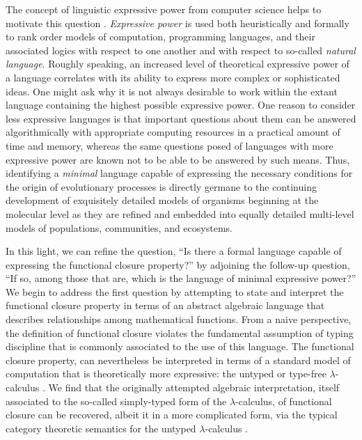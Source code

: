 \documentclass[10pt]{article}
\theoremstyle{plain}
\theoremstyle{definition}
\theoremstyle{remark}
\begin{document}
The concept of linguistic expressive power from computer science helps to motivate this question \cite{Felleisen1991}. \emph{Expressive power} is used both heuristically and formally to rank order models of computation, programming languages, and their associated logics with respect to one another and with respect to so-called \emph{natural language}. Roughly speaking, an increased level of theoretical expressive power of a language correlates with its ability to express more complex or sophisticated ideas. One might ask why it is not always desirable to work within the extant language containing the highest possible expressive power. One reason to consider less expressive languages is that important questions about them can be answered algorithmically with appropriate computing resources in a practical amount of time and memory, whereas the same questions posed of languages with more expressive power are known not to be able to be answered by such means\cite{Hopcroft2007}. Thus, identifying a \emph{minimal} language capable of expressing the necessary conditions for the origin of evolutionary processes is directly germane to the continuing development of exquisitely detailed models of organisms beginning at the molecular level as they are refined and embedded into equally detailed multi-level models of populations, communities, and ecosystems.

In this light, we can refine the question, ``Is there a formal language capable of expressing the functional closure property?'' by adjoining the follow-up question, ``If so, among those that are, which is the language of minimal expressive power?'' We begin to address the first question by attempting to state and interpret the functional closure property in terms of an abstract algebraic language that describes relationships among mathematical functions. From a naive perspective, the definition of functional closure violates the fundamental assumption of typing discipline that is commonly associated to the use of this language. The functional closure property, can nevertheless be interpreted in terms of a standard model of computation that is theoretically more expressive: the untyped or type-free $\lambda$-calculus \cite{Mossio2009}. We find that the originally attempted algebraic interpretation, itself associated to the so-called simply-typed form of the $\lambda$-calculus, of functional closure can be recovered, albeit it in a more complicated form, via the typical category theoretic semantics for the untyped $\lambda$-calculus \cite{Scott1980,Barendregt1985,Abramsky1995}.
\end{document}
